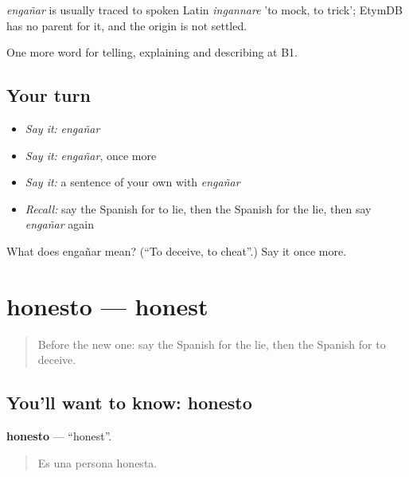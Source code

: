\begin{cousinweb}
\emph{engañar} is usually traced to spoken Latin \emph{ingannare} 'to mock, to trick'; EtymDB has no parent for it, and the origin is not settled.
\end{cousinweb}

\begin{grammarlens}[title={What you've built}]
One more word for telling, explaining and describing at B1.
\end{grammarlens}

\subsection*{Your turn}
\begin{itemize}
\raggedright
  \item \emph{Say it:} \emph{engañar}
  \item \emph{Say it:} \emph{engañar}, once more
  \item \emph{Say it:} a sentence of your own with \emph{engañar}
  \item \emph{Recall:} say the Spanish for to lie, then the Spanish for the lie, then say \emph{engañar} again
\end{itemize}

\begin{tcolorbox}[breakable,colback=teal!4,colframe=teal!35!black,title={Before you move on}]
What does engañar mean? (\textquotedblleft{}To deceive, to cheat\textquotedblright{}.) Say it once more.
\end{tcolorbox}
\section[honesto]{honesto — honest}

\label{lesson:ES-C636-honesto}



\begin{quote}
Before the new one: say the Spanish for the lie, then the Spanish for to deceive.
\end{quote}

\subsection*{You'll want to know: honesto}
\textbf{honesto} — \textquotedblleft{}honest\textquotedblright{}.

\begin{quote}
Es una persona honesta.
\end{quote}

